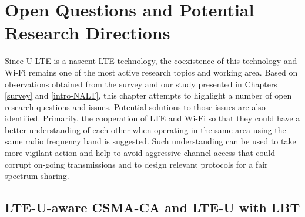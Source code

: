 %
%
%
\chapter{Open Questions and Potential Research Directions}
\label{open-research} %


Since \mbox{U-LTE} is a nascent LTE technology, the coexistence of this technology and \mbox{Wi-Fi} remains one of the most active research topics and working area. Based on observations obtained from the survey and our study presented in Chapters \ref{survey} and \ref{intro-NALT}, this chapter attempts to highlight a number of open research questions and issues. Potential solutions to those issues are also identified. Primarily, the cooperation of LTE and \mbox{Wi-Fi} so that they could have a better understanding of each other when operating in the same area using the same radio frequency band is suggested. Such understanding can be used to take more vigilant action and help to avoid aggressive channel access that could corrupt on-going transmissions and to design relevant protocols for a fair spectrum sharing.

\section{LTE-U-aware CSMA-CA and LTE-U with LBT}
\label{subsection:LTE-U-aware}

